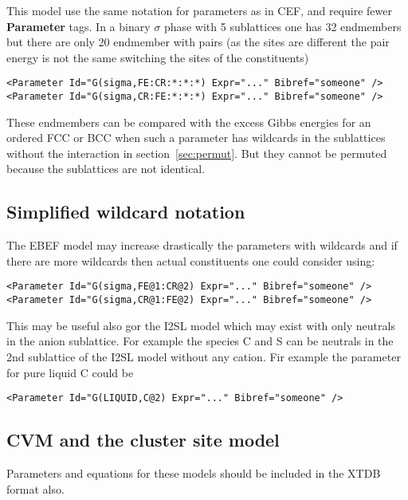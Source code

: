 \documentclass{article}
\begin{document}
\begin{appendices}
This model use the same notation for parameters as in CEF, and require
fewer {\bf Parameter} tags.  In a binary $\sigma$ phase with 5
sublattices one has 32 endmembers but there are only 20 endmember with
pairs (as the sites are different the pair energy is not the same
switching the sites of the constituents)

\begin{verbatim}
<Parameter Id="G(sigma,FE:CR:*:*:*) Expr="..." Bibref="someone" />
<Parameter Id="G(sigma,CR:FE:*:*:*) Expr="..." Bibref="someone" />
\end{verbatim}

These endmembers can be compared with the excess Gibbs energies for an
ordered FCC or BCC when such a parameter has wildcards in the
sublattices without the interaction in section~\ref{sec:permut}.  But
they cannot be permuted because the sublattices are not identical.

\subsection{Simplified wildcard notation}\label{sec:useat}

The EBEF model may increase drastically the parameters with wildcards
and if there are more wildcards then actual constituents one could
consider using:

\begin{verbatim}
<Parameter Id="G(sigma,FE@1:CR@2) Expr="..." Bibref="someone" />
<Parameter Id="G(sigma,CR@1:FE@2) Expr="..." Bibref="someone" />
\end{verbatim}

This may be useful also gor the I2SL model which may exist with only
neutrals in the anion sublattice.  For example the species C and S can
be neutrals in the 2nd sublattice of the I2SL model without any cation.
Fir example the parameter for pure liquid C could be

\begin{verbatim}
<Parameter Id="G(LIQUID,C@2) Expr="..." Bibref="someone" />
\end{verbatim}

\subsection{CVM and the cluster site model}

Parameters and equations for these models should be included in the
XTDB format also.

\newpage


\end{appendices}
\end{document}
